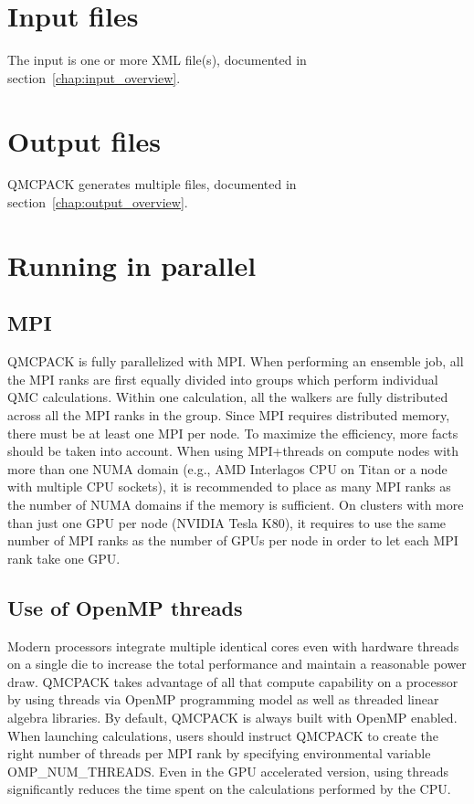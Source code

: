 \section{Input files}
\label{sec:inputs}
The input is one or more XML file(s), documented in section~\ref{chap:input_overview}.

\section{Output files}
QMCPACK generates multiple files, documented in section~\ref{chap:output_overview}.

\section{Running in parallel}
\label{sec:parallelrunning}


\subsection{MPI}
QMCPACK is fully parallelized with MPI. When performing an ensemble job, all
the MPI ranks are first equally divided into groups which perform individual
QMC calculations. Within one calculation, all the walkers are fully distributed
across all the MPI ranks in the group. Since MPI requires distributed memory,
there must be at least one MPI per node. To maximize the efficiency, more facts
should be taken into account. When using MPI+threads on compute nodes with more
than one NUMA domain (e.g., AMD Interlagos CPU on Titan or a node with multiple
CPU sockets), it is recommended to place as many MPI ranks as the number of
NUMA domains if the memory is sufficient. On clusters with more than just one
GPU per node (NVIDIA Tesla K80), it requires to use the same number of MPI
ranks as the number of GPUs per node in order to let each MPI rank take one GPU.

\subsection{Use of OpenMP threads}
\label{sec:openmprunning}
Modern processors integrate multiple identical cores even with hardware threads
on a single die to increase the total performance and maintain a reasonable
power draw. QMCPACK takes advantage of all that compute capability on a
processor by using threads via OpenMP programming model as well as threaded linear algebra libraries. By default, QMCPACK is always built with OpenMP enabled. When launching calculations, users should instruct QMCPACK to create the right number of threads per MPI rank by specifying environmental variable OMP\_NUM\_THREADS. Even in the GPU accelerated version, using threads significantly reduces the time spent on the calculations performed by the CPU.

